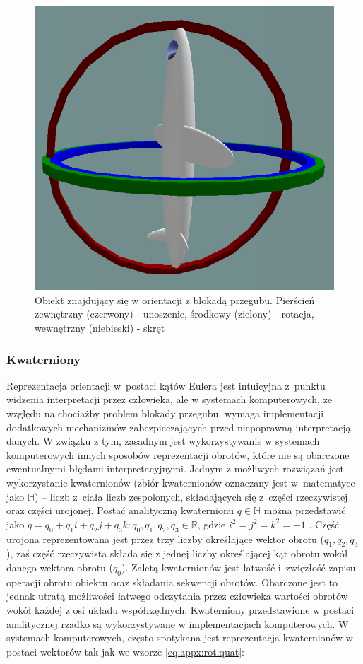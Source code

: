 \begin{figure}[!htb]
	\centering
	\includegraphics[width=0.6\linewidth]{images/GimbalLock.png}
	\caption[Obiekt znajdujący się w orientacji z blokadą przegubu]{Obiekt znajdujący się w orientacji z blokadą przegubu. Pierścień zewnętrzny (czerwony) - unoszenie, środkowy (zielony) - rotacja, wewnętrzny (niebieski) - skręt}
	\label{fig:rot:euler:gimbal}
\end{figure}
																								
\subsubsection*{Kwaterniony}
Reprezentacja orientacji w~postaci kątów Eulera jest intuicyjna z~punktu widzenia interpretacji przez człowieka, ale w systemach komputerowych, ze względu na chociażby problem blokady przegubu, wymaga implementacji dodatkowych mechanizmów zabezpieczających przed niepoprawną interpretacją danych. W związku z tym, zasadnym jest wykorzystywanie w systemach komputerowych innych sposobów reprezentacji obrotów, które nie są obarczone ewentualnymi błędami interpretacyjnymi. Jednym z możliwych rozwiązań jest wykorzystanie kwaternionów (zbiór kwaternionów oznaczany jest w~matematyce jako $\mathbb{H}$) -- liczb z~ciała liczb zespolonych, składających się z~części rzeczywistej oraz części urojonej. Postać analityczną kwaternionu $q \in\mathbb{H}$ można przedstawić jako  $q = {q_0 + q_1 i + q_2 j + q_3 k : q_0, q_1, q_2, q_3 \in \mathbb{R}}$, gdzie $i^2 = j^2 = k^2 = -1$ \cite{Huerta2010}. Część urojona reprezentowana jest przez trzy liczby określające wektor obrotu ($ q_1, q_2, q_3$), zaś część rzeczywista składa się z jednej liczby określającej kąt obrotu wokół danego wektora obrotu ($q_0$). Zaletą kwaternionów jest łatwość i~zwięzłość zapisu operacji obrotu obiektu oraz składania sekwencji obrotów. Obarczone jest to jednak utratą możliwości łatwego odczytania przez człowieka wartości obrotów wokół każdej z osi układu współrzędnych. Kwaterniony przedstawione w postaci analitycznej rzadko są wykorzystywane w implementacjach komputerowych. W systemach komputerowych, często spotykana jest reprezentacja kwaternionów w postaci wektorów tak jak we wzorze \ref{eq:appx:rot:quat}:
																													
